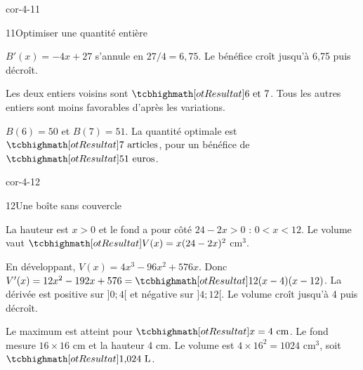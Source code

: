 \begin{blocLivre}{cor-4-11}
\begin{corrige}{11}{Optimiser une quantité entière}
\begin{questions}
\item $B'(x)=-4x+27$ s'annule en $27/4=6{,}75$.
Le bénéfice croît jusqu'à 6,75 puis décroît.
\item Les deux entiers voisins sont $\res{6\text{ et }7}$.
Tous les autres entiers sont moins favorables d'après les variations.
\item $B(6)=50$ et $B(7)=51$. La quantité optimale est $\res{7\text{ articles}}$,
pour un bénéfice de $\res{51\text{ euros}}$.
\end{questions}
\label{figlivre-r04-11-var-cor}

\end{corrige}
\end{blocLivre}
\begin{blocLivre}{cor-4-12}
\begin{corrige}{12}{Une boîte sans couvercle}
\begin{questions}
\item La hauteur est $x>0$ et le fond a pour côté $24-2x>0$ : $0<x<12$.
Le volume vaut $\res{V(x)=x(24-2x)^2}$ cm$^3$.
\item En développant, $V(x)=4x^3-96x^2+576x$.
Donc $V'(x)=12x^2-192x+576=\res{12(x-4)(x-12)}$.
La dérivée est positive sur $]0;4[$ et négative sur $]4;12[$.
Le volume croît jusqu'à 4 puis décroît.
\item Le maximum est atteint pour $\res{x=4\text{ cm}}$.
Le fond mesure $16\times16$ cm et la hauteur 4 cm.
Le volume est $4\times16^2=1024$ cm$^3$, soit $\res{1{,}024\text{ L}}$.
\end{questions}
\label{figlivre-r04-12-var-cor}

\label{figlivre-r04-12-boite-cor}

\end{corrige}
\end{blocLivre}
